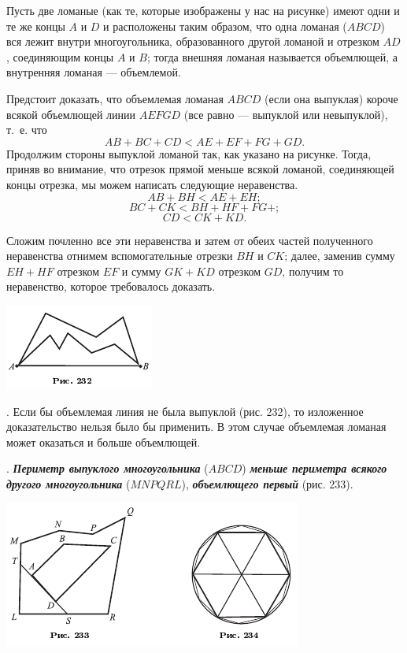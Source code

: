 \documentclass[oneside]{book}
\begin{document}
Пусть две ломаные (как те, которые изображены у нас на рисунке) имеют одни и те же концы $A$ и $D$ и расположены таким образом, что одна ломаная ($ABCD$) вся лежит внутри многоугольника, образованного другой ломаной и отрезком $AD$, соединяющим концы $A$ и $B$;
тогда внешняя ломаная называется объемлющей, а внутренняя ломаная — объемлемой.

Предстоит доказать, что объемлемая ломаная $ABCD$ (если она выпуклая) короче всякой объемлющей линии $AEFGD$ (все равно — выпуклой или невыпуклой), т.~е.
что
\[AB+BC+CD<AE+EF+FG+GD.\]
Продолжим стороны выпуклой ломаной так, как указано на рисунке.
Тогда, приняв во внимание, что отрезок прямой меньше всякой ломаной, соединяющей концы отрезка, мы можем написать следующие неравенства.
\[AB+BH<AE+EH;\]
\[BC+CK<BH+HF+FG+;\]
\[CD<CK+KD.\]

Сложим почленно все эти неравенства и затем от обеих частей полученного неравенства отнимем вспомогательные отрезки $BH$ и $CK$;
далее, заменив сумму $EH+HF$ отрезком $EF$ и сумму $GK+KD$ отрезком $GD$, получим то неравенство, которое требовалось доказать.

\includegraphics{pics/ris-232}

.
Если бы объемлемая линия не была выпуклой (рис. 232), то изложенное доказательство нельзя было бы применить.
В этом случае объемлемая ломаная может оказаться и больше объемлющей.

.
\textbf{\emph{Периметр выпуклого многоугольника}} ($ABCD$) \textbf{\emph{меньше периметра всякого другого многоугольника}} ($MNPQRL$), \textbf{\emph{объемлющего первый}} (рис. 233).

\includegraphics{pics/ris-233-234}
\end{document}
